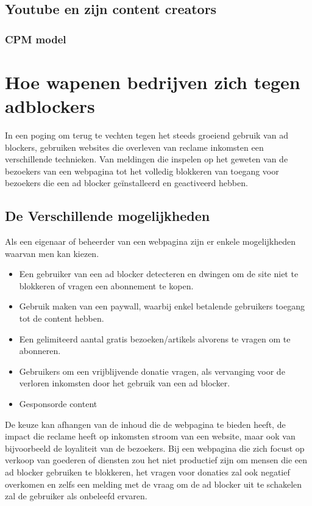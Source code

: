 \documentclass[pdftex,a4paper,12pt,twoside]{report}
\begin{document}
\section{Youtube en zijn content creators}
\label{sec:Youtube en zijn content creators}
\subsection{CPM model}
\label{sec CPM model}


\chapter{Hoe wapenen bedrijven zich tegen adblockers}
\label{ch:Hoe wapenen bedrijven zich tegen adblockers}
In een poging om terug te vechten tegen het steeds groeiend gebruik van ad blockers, gebruiken websites die overleven van reclame inkomsten een verschillende technieken. Van meldingen die inspelen op het geweten van de bezoekers van een webpagina tot het volledig blokkeren van toegang voor bezoekers die een ad blocker geïnstalleerd en geactiveerd hebben.

\section{De Verschillende mogelijkheden}
\label{sec:De Verschillende mogelijkheden}
Als een eigenaar of beheerder van een webpagina zijn er enkele mogelijkheden waarvan men kan kiezen. 

\begin{itemize}
	\item Een gebruiker van een ad blocker detecteren en dwingen om de site niet te blokkeren of vragen een abonnement te kopen.
	\item Gebruik maken van een paywall, waarbij enkel betalende gebruikers toegang tot de content hebben.
	\item Een gelimiteerd aantal gratis bezoeken/artikels alvorens te vragen om te abonneren.
	\item Gebruikers om een vrijblijvende donatie vragen, als vervanging voor de verloren inkomsten door het gebruik van een ad blocker.
	\item Gesponsorde content
	
\end{itemize}

De keuze kan afhangen van de inhoud die de webpagina te bieden heeft, de impact die reclame heeft op inkomsten stroom van een website, maar ook van bijvoorbeeld de loyaliteit van de bezoekers. Bij een webpagina die zich focust op verkoop van goederen of diensten zou het niet productief zijn om mensen die een ad blocker gebruiken te blokkeren, het vragen voor donaties zal ook negatief overkomen en zelfs een melding met de vraag om de ad blocker uit te schakelen zal de gebruiker als onbeleefd ervaren.
\end{document}
